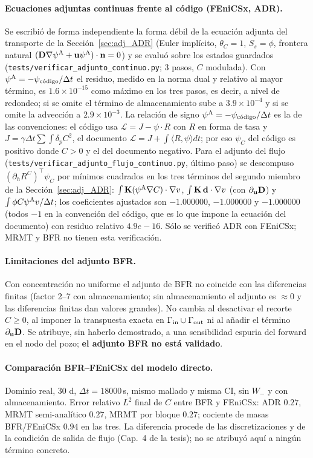 \paragraph{Ecuaciones adjuntas continuas frente al c\'odigo (FEniCSx, ADR).}
Se escribi\'o de forma independiente la forma d\'ebil de la ecuaci\'on adjunta del transporte de la Secci\'on~\ref{sec:adj_ADR}
(Euler impl\'icito, $\theta_C=1$, $S_s=\phi$, frontera natural $(\mathbf{D}\nabla\psi^{\mathrm{A}}+\mathbf{u}\psi^{\mathrm{A}})\cdot\mathbf{n}=0$) y se evalu\'o sobre los
estados guardados (\texttt{tests/verificar\_adjunto\_continuo.py}; 3 pasos, $C$ modulada). Con
$\psi^{\mathrm{A}}=-\psi_{\text{c\'odigo}}/\Delta t$ el residuo, medido en la norma dual y relativo al mayor t\'ermino, es $1.6\times10^{-15}$ como m\'aximo en
los tres pasos, es decir, a nivel de redondeo; si se omite el t\'ermino de almacenamiento sube a $3.9\times10^{-4}$ y si se omite la advecci\'on a $2.9\times10^{-3}$.
La relaci\'on de signo $\psi^{\mathrm{A}}=-\psi_{\text{c\'odigo}}/\Delta t$ es la de las convenciones: el c\'odigo usa $\mathcal{L}=J-\psi\cdot R$ con
$R$ en forma de tasa y $J=\gamma\Delta t\sum\int\delta_pC^2$, el documento $\mathcal{L}=J+\int\langle R,\psi\rangle dt$; por eso $\psi_C$
del c\'odigo es positivo donde $C>0$ y el del documento negativo.
Para el adjunto del flujo (\texttt{tests/verificar\_adjunto\_flujo\_continuo.py}, \'ultimo paso) se descompuso $(\partial_hR^C)^\top\psi_C$ por
m\'inimos cuadrados en los tres t\'erminos del segundo miembro de la Secci\'on~\ref{sec:adj_ADR}: $\int\mathbf{K}(\psi^{\mathrm{A}}\nabla C)\cdot\nabla v$,
$\int\mathbf{K}\,\mathbf{d}\cdot\nabla v$ (con $\partial_{\mathbf{u}}\mathbf{D}$) y $\int\phi C\psi^{\mathrm{A}} v/\Delta t$; los coeficientes ajustados son
$-1.000000$, $-1.000000$ y $-1.000000$ (todos $-1$ en la convenci\'on del c\'odigo, que es lo que impone la ecuaci\'on del documento) con residuo relativo $4.9e-16$.
S\'olo se verific\'o ADR con FEniCSx; MRMT y BFR no tienen esta verificaci\'on.


\paragraph{Limitaciones del adjunto BFR.} Con concentraci\'on no uniforme el adjunto de BFR no coincide con las diferencias finitas
(factor 2--7 con almacenamiento; sin almacenamiento el adjunto es $\approx0$ y las diferencias finitas dan valores grandes). No cambia
al desactivar el recorte $C\ge0$, al imponer la transpuesta exacta en $\Gamma_{\mathrm{in}}\cup\Gamma_{\mathrm{out}}$ ni al a\~nadir el t\'ermino $\partial_{\mathbf{u}}\mathbf{D}$.
Se atribuye, sin haberlo demostrado, a una sensibilidad espuria del forward en el nodo del pozo; \textbf{el adjunto BFR no est\'a validado}.

\paragraph{Comparaci\'on BFR--FEniCSx del modelo directo.} Dominio real, 30 d, $\Delta t=18000$\,s, mismo mallado y misma CI, sin $W_-$ y con
almacenamiento. Error relativo $L^2$ final de $C$ entre BFR y FEniCSx: ADR $0.27$, MRMT semi-anal\'itico $0.27$, MRMT por bloque $0.27$;
cociente de masas BFR/FEniCSx $0.94$ en las tres. La diferencia procede de las discretizaciones y de la condici\'on de salida de flujo (Cap.~4 de la tesis); no se
atribuy\'o aqu\'i a ning\'un t\'ermino concreto.

